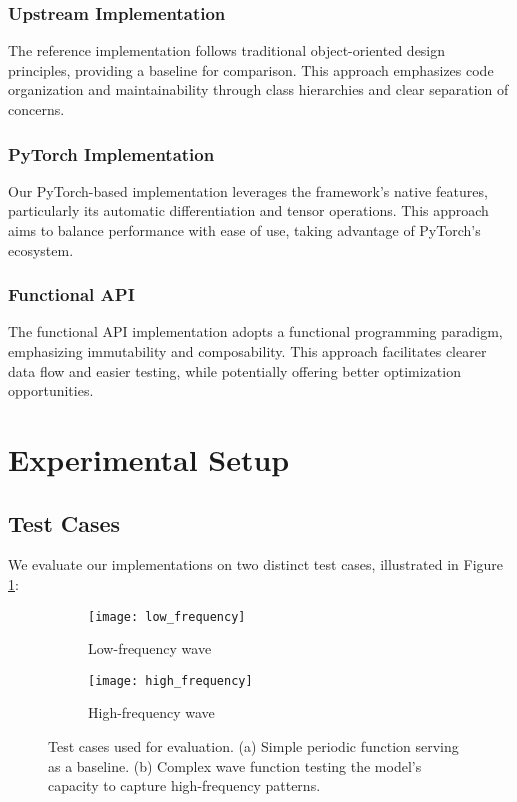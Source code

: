 \documentclass[10pt,journal,compsoc]{IEEEtran}
\begin{document}
\subsubsection{Upstream Implementation}
The reference implementation follows traditional object-oriented design principles, providing a baseline for comparison. This approach emphasizes code organization and maintainability through class hierarchies and clear separation of concerns.

\subsubsection{PyTorch Implementation}
Our PyTorch-based implementation leverages the framework's native features, particularly its automatic differentiation and tensor operations. This approach aims to balance performance with ease of use, taking advantage of PyTorch's ecosystem.

\subsubsection{Functional API}
The functional API implementation adopts a functional programming paradigm, emphasizing immutability and composability. This approach facilitates clearer data flow and easier testing, while potentially offering better optimization opportunities.

\section{Experimental Setup}
\subsection{Test Cases}
We evaluate our implementations on two distinct test cases, illustrated in Figure \ref{fig:test_cases}:

\begin{figure}[t]
    \centering
    \begin{subfigure}[b]{0.48\linewidth}
        \texttt{[image: low\_frequency]}
        \caption{Low-frequency wave}
    \end{subfigure}
    \begin{subfigure}[b]{0.48\linewidth}
        \texttt{[image: high\_frequency]}
        \caption{High-frequency wave}
    \end{subfigure}
    \caption{Test cases used for evaluation. (a) Simple periodic function serving as a baseline. (b) Complex wave function testing the model's capacity to capture high-frequency patterns.}
    \label{fig:test_cases}
\end{figure}
\end{document}
